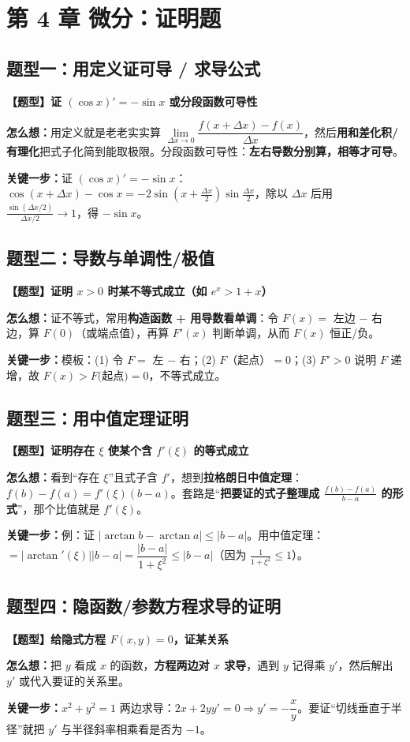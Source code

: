 ﻿\documentclass[11pt,a4paper,UTF8]{ctexart}
\newcommand{\thm}[1]{\par\smallskip\noindent\colorbox{blue!8}{\textbf{【题型】#1}}\par\smallskip}
\newcommand{\think}[1]{\par\smallskip\noindent\textcolor{purple!75!black}{\textbf{怎么想：}#1}\par\smallskip}
\newcommand{\key}[1]{\par\smallskip\noindent\colorbox{yellow!22}{\textbf{关键一步：}#1}\par\smallskip}
\begin{document}
\section{第 4 章 微分：证明题}

\subsection{题型一：用定义证可导 / 求导公式}

\thm{证 $(\cos x)'=-\sin x$ 或分段函数可导性}
\think{用定义就是老老实实算 $\lim\limits_{\Delta x\to0}\dfrac{f(x+\Delta x)-f(x)}{\Delta x}$，然后\textbf{用和差化积/有理化}把式子化简到能取极限。分段函数可导性：\textbf{左右导数分别算，相等才可导}。}
\key{证 $(\cos x)'=-\sin x$：$\cos(x+\Delta x)-\cos x=-2\sin\left(x+\frac{\Delta x}2\right)\sin\frac{\Delta x}{2}$，除以 $\Delta x$ 后用 $\frac{\sin(\Delta x/2)}{\Delta x/2}\to1$，得 $-\sin x$。}

\subsection{题型二：导数与单调性/极值}

\thm{证明 $x>0$ 时某不等式成立（如 $e^x>1+x$）}
\think{证不等式，常用\textbf{构造函数 + 用导数看单调}：令 $F(x)=$ 左边 $-$ 右边，算 $F(0)$（或端点值），再算 $F'(x)$ 判断单调，从而 $F(x)$ 恒正/负。}
\key{模板：(1) 令 $F=$ 左 $-$ 右；(2) $F$（起点）$=0$；(3) $F'>0$ 说明 $F$ 递增，故 $F(x)>F($起点$)=0$，不等式成立。}

\subsection{题型三：用中值定理证明}

\thm{证明存在 $\xi$ 使某个含 $f'(\xi)$ 的等式成立}
\think{看到“存在 $\xi$”且式子含 $f'$，想到\textbf{拉格朗日中值定理}：$f(b)-f(a)=f'(\xi)(b-a)$。套路是“\textbf{把要证的式子整理成 $\frac{f(b)-f(a)}{b-a}$ 的形式}”，那个比值就是 $f'(\xi)$。}
\key{例：证 $\left|\arctan b-\arctan a\right|\le|b-a|$。用中值定理：$=|\arctan'(\xi)||b-a|=\dfrac{|b-a|}{1+\xi^2}\le|b-a|$（因为 $\frac1{1+\xi^2}\le1$）。}

\subsection{题型四：隐函数/参数方程求导的证明}

\thm{给隐式方程 $F(x,y)=0$，证某关系}
\think{把 $y$ 看成 $x$ 的函数，\textbf{方程两边对 $x$ 求导}，遇到 $y$ 记得乘 $y'$，然后解出 $y'$ 或代入要证的关系里。}
\key{$x^2+y^2=1$ 两边求导：$2x+2yy'=0\Rightarrow y'=-\dfrac xy$。要证“切线垂直于半径”就把 $y'$ 与半径斜率相乘看是否为 $-1$。}
\end{document}
